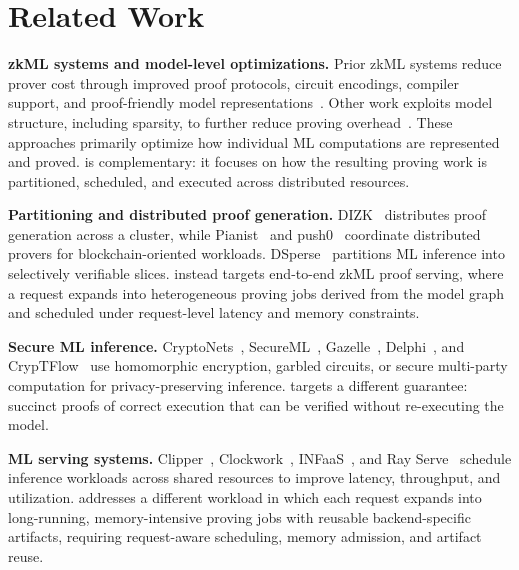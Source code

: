 \section{Related Work}
\label{sec:related-work}

\noindent\textbf{zkML systems and model-level optimizations.}
Prior zkML systems reduce prover cost through improved proof protocols, circuit encodings, compiler support, and proof-friendly model representations~\cite{ghodsi2017safetynets,liu2021zkcnn,boyuan2021zen,lee2024vcnn,weng2021mystique,chen2024zkml,chen2025zktorch,xie2025zkpytorch,sin2024zkllm,ezkl,halo2book}. Other work exploits model structure, including sparsity, to further reduce proving overhead~\cite{maheri2025telesparse,li2024sparsity}. These approaches primarily optimize how individual ML computations are represented and proved. \TITLE{} is complementary: it focuses on how the resulting proving work is partitioned, scheduled, and executed across distributed resources.

\noindent\textbf{Partitioning and distributed proof generation.}
DIZK~\cite{wu2018dizk} distributes proof generation across a cluster, while Pianist~\cite{liu2024pianist} and push0~\cite{ahmadvand2026push0} coordinate distributed provers for blockchain-oriented workloads. DSperse~\cite{ivanov2025dsperse} partitions ML inference into selectively verifiable slices. \TITLE{} instead targets end-to-end zkML proof serving, where a request expands into heterogeneous proving jobs derived from the model graph and scheduled under request-level latency and memory constraints.

\noindent\textbf{Secure ML inference.}
CryptoNets~\cite{gilad2016cryptonets}, SecureML~\cite{mohassel2017secureml}, Gazelle~\cite{juvekar2018gazelle}, Delphi~\cite{mishra2020delphi}, and CrypTFlow~\cite{kumar2020cryptflow} use homomorphic encryption, garbled circuits, or secure multi-party computation for privacy-preserving inference. \TITLE{} targets a different guarantee: succinct proofs of correct execution that can be verified without re-executing the model.

\noindent\textbf{ML serving systems.}
Clipper~\cite{crankshaw2017clipper}, Clockwork~\cite{gujarati2020serving}, INFaaS~\cite{romero2021infaas}, and Ray Serve~\cite{rayserve} schedule inference workloads across shared resources to improve latency, throughput, and utilization. \TITLE{} addresses a different workload in which each request expands into long-running, memory-intensive proving jobs with reusable backend-specific artifacts, requiring request-aware scheduling, memory admission, and artifact reuse.